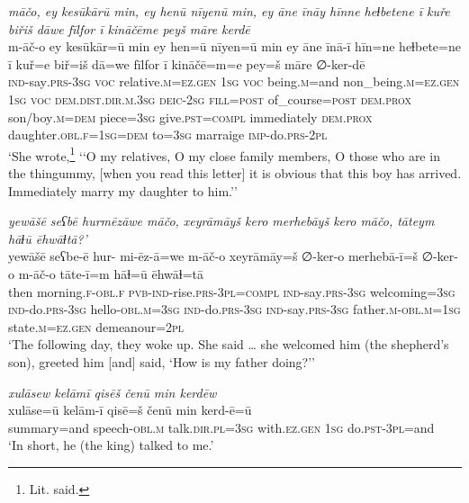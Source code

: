 \ea \label{KŠ.80}
\textit{māčo, ey kesūkārū min, ey henū nīyenū min, ey āne īnāy hīnne heɫbetene ī kuře biřiš dāwe fīlfor ī kināčēme peyš māre kerdē} \\ 
\gll m-āč-o ey kesūkār=ū min ey hen=ū nīyen=ū min ey āne īnā-ī hīn=ne heɫbete=ne ī kuř=e biř=iš dā=we fīlfor ī kināčē=m=e pey=š māre ∅-ker-dē \\ 
 \textsc{ind-}say\textsc{.prs}\textsc{-3sg} \textsc{voc} relative\textsc{.m}\textsc{\textsc{=ez.gen}} \textsc{1sg} \textsc{voc} being\textsc{.m}=and non\_being\textsc{.m}\textsc{\textsc{=ez.gen}} \textsc{1sg} \textsc{voc} \textsc{dem.dist}\textsc{.dir}\textsc{.m}\textsc{.3sg} \textsc{deic}-\textsc{2sg} \textsc{fill}\textsc{=\textsc{post}} of\_course\textsc{=\textsc{post}} \textsc{dem.prox} son/boy\textsc{.m}\textsc{=dem} piece\textsc{=3sg} give\textsc{.pst}\textsc{=compl} immediately \textsc{dem.prox} daughter\textsc{.obl}\textsc{.f}\textsc{=\textsc{1sg}}\textsc{=dem} to\textsc{=3sg} marraige \textsc{imp-}do\textsc{.prs}-\textsc{2pl} \\ 
\glt `She wrote,\footnote{Lit. said.} ‘‘O my relatives, O my close family members, O those who are in the thingummy, [when you read this letter] it is obvious that this boy has arrived. Immediately marry my daughter to him.’'
\z 
 
\ea \label{KŠ.81}
\textit{yewāšē seʕbē hurmēzāwe māčo, xeyrāmāyš kero merhebāyš kero māčo, tāteym hāɫū ēhwāɫtā?’} \\ 
\gll yewāšē seʕbe-ē hur- mi-ēz-ā=we m-āč-o xeyrāmāy=š ∅-ker-o merhebā-ī=š ∅-ker-o m-āč-o tāte-ī=m hāɫ=ū ēhwāɫ=tā \\ 
 then morning\textsc{.f}\textsc{-obl}\textsc{.f} \textsc{pvb-}\textsc{ind-}rise\textsc{.prs}\textsc{-3pl}\textsc{=compl} \textsc{ind-}say\textsc{.prs}\textsc{-3sg} welcoming\textsc{=3sg} \textsc{ind-}do\textsc{.prs}\textsc{-3sg} hello\textsc{-obl}\textsc{.m}\textsc{=3sg} \textsc{ind-}do\textsc{.prs}\textsc{-3sg} \textsc{ind-}say\textsc{.prs}\textsc{-3sg} father\textsc{.m}\textsc{-obl}\textsc{.m}\textsc{=\textsc{1sg}} state\textsc{.m}\textsc{\textsc{=ez.gen}} demeanour=\textsc{2pl} \\ 
\glt `The following day, they woke up. She said … she welcomed him (the shepherd’s son), greeted him [and] said, ‘How is my father doing?’'
\z 
 
\ea \label{KŠ.83}
\textit{xulāsew kelāmī qisēš čenū min kerdēw} \\ 
\gll xulāse=ū kelām-ī qisē=š čenū min kerd-ē=ū \\ 
 summary=and speech\textsc{-obl}\textsc{.m} talk\textsc{.dir}\textsc{.pl}\textsc{=3sg} with\textsc{\textsc{.ez}.gen} \textsc{1sg} do\textsc{.pst}\textsc{-3pl}=and \\ 
\glt `In short, he (the king) talked to me.'
\z 
 
